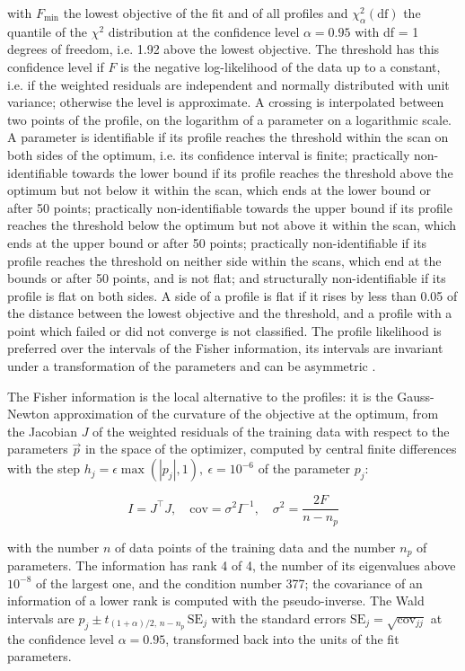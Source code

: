 with $F_{\min}$ the lowest objective of the fit and of all profiles and $\chi^2_{\alpha}(\mathrm{df})$ the quantile of the $\chi^2$ distribution at the confidence level $\alpha = 0.95$ with df = 1 degrees of freedom, i.e. 1.92 above the lowest objective. The threshold has this confidence level if $F$ is the negative log-likelihood of the data up to a constant, i.e. if the weighted residuals are independent and normally distributed with unit variance; otherwise the level is approximate. A crossing is interpolated between two points of the profile, on the logarithm of a parameter on a logarithmic scale. A parameter is identifiable if its profile reaches the threshold within the scan on both sides of the optimum, i.e. its confidence interval is finite; practically non-identifiable towards the lower bound if its profile reaches the threshold above the optimum but not below it within the scan, which ends at the lower bound or after 50 points; practically non-identifiable towards the upper bound if its profile reaches the threshold below the optimum but not above it within the scan, which ends at the upper bound or after 50 points; practically non-identifiable if its profile reaches the threshold on neither side within the scans, which end at the bounds or after 50 points, and is not flat; and structurally non-identifiable if its profile is flat on both sides. A side of a profile is flat if it rises by less than 0.05 of the distance between the lowest objective and the threshold, and a profile with a point which failed or did not converge is not classified. The profile likelihood is preferred over the intervals of the Fisher information, its intervals are invariant under a transformation of the parameters and can be asymmetric \cite{Wieland2021}.

The Fisher information is the local alternative to the profiles: it is the Gauss-Newton approximation of the curvature of the objective at the optimum, from the Jacobian $J$ of the weighted residuals of the training data with respect to the parameters $\vec{p}$ in the space of the optimizer, computed by central finite differences with the step $h_j = \epsilon \max(|p_j|, 1),\ \epsilon = 10^{-6}$ of the parameter $p_j$:

\begin{equation}
I = J^\top J, \quad \mathrm{cov} = \sigma^2 I^{-1}, \quad \sigma^2 = \frac{2 F}{n - n_p}
\end{equation}

with the number $n$ of data points of the training data and the number $n_p$ of parameters. The information has rank 4 of 4, the number of its eigenvalues above $10^{-8}$ of the largest one, and the condition number 377; the covariance of an information of a lower rank is computed with the pseudo-inverse. The Wald intervals are $\hat{p}_j \pm t_{(1+\alpha)/2,\, n-n_p}\, \mathrm{SE}_j$ with the standard errors $\mathrm{SE}_j = \sqrt{\mathrm{cov}_{jj}}$ at the confidence level $\alpha = 0.95$, transformed back into the units of the fit parameters.

